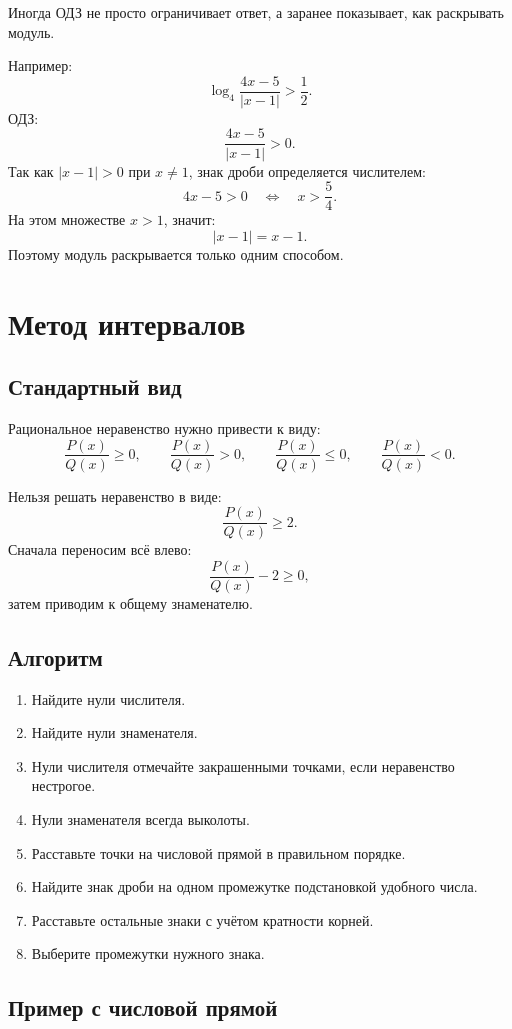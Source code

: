 \documentclass[a4paper,12pt]{article}
\begin{document}
Иногда ОДЗ не просто ограничивает ответ, а заранее показывает, как раскрывать модуль.

Например:
\[
    \log_4 \frac{4x-5}{|x-1|}>\frac12.
\]
ОДЗ:
\[
    \frac{4x-5}{|x-1|}>0.
\]
Так как \(|x-1|>0\) при \(x\ne 1\), знак дроби определяется числителем:
\[
    4x-5>0
    \quad \Longleftrightarrow \quad
    x>\frac54.
\]
На этом множестве \(x>1\), значит:
\[
    |x-1|=x-1.
\]
Поэтому модуль раскрывается только одним способом.

\section{Метод интервалов}

\subsection{Стандартный вид}

Рациональное неравенство нужно привести к виду:
\[
    \frac{P(x)}{Q(x)}\ge 0,
    \qquad
    \frac{P(x)}{Q(x)}>0,
    \qquad
    \frac{P(x)}{Q(x)}\le 0,
    \qquad
    \frac{P(x)}{Q(x)}<0.
\]

Нельзя решать неравенство в виде:
\[
    \frac{P(x)}{Q(x)}\ge 2.
\]
Сначала переносим всё влево:
\[
    \frac{P(x)}{Q(x)}-2\ge 0,
\]
затем приводим к общему знаменателю.

\subsection{Алгоритм}

\begin{enumerate}
    \item Найдите нули числителя.
    \item Найдите нули знаменателя.
    \item Нули числителя отмечайте закрашенными точками, если неравенство нестрогое.
    \item Нули знаменателя всегда выколоты.
    \item Расставьте точки на числовой прямой в правильном порядке.
    \item Найдите знак дроби на одном промежутке подстановкой удобного числа.
    \item Расставьте остальные знаки с учётом кратности корней.
    \item Выберите промежутки нужного знака.
\end{enumerate}

\subsection{Пример с числовой прямой}
\end{document}
